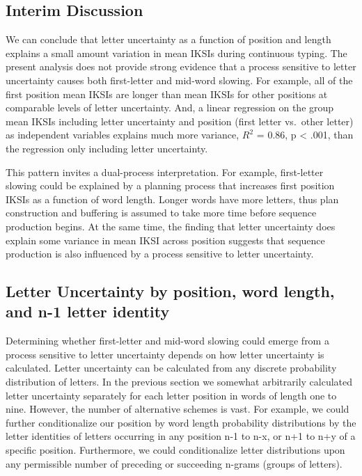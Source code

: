 \documentclass[,man,floatsintext]{apa6}
\begin{document}
\hypertarget{interim-discussion}{%
\subsection{Interim Discussion}\label{interim-discussion}}

We can conclude that letter uncertainty as a function of position and length explains a small amount variation in mean IKSIs during continuous typing. The present analysis does not provide strong evidence that a process sensitive to letter uncertainty causes both first-letter and mid-word slowing. For example, all of the first position mean IKSIs are longer than mean IKSIs for other positions at comparable levels of letter uncertainty. And, a linear regression on the group mean IKSIs including letter uncertainty and position (first letter vs.~other letter) as independent variables explains much more variance, \(R^2\) = 0.86, p \textless{} .001, than the regression only including letter uncertainty.

This pattern invites a dual-process interpretation. For example, first-letter slowing could be explained by a planning process that increases first position IKSIs as a function of word length. Longer words have more letters, thus plan construction and buffering is assumed to take more time before sequence production begins. At the same time, the finding that letter uncertainty does explain some variance in mean IKSI across position suggests that sequence production is also influenced by a process sensitive to letter uncertainty.

\hypertarget{letter-uncertainty-by-position-word-length-and-n-1-letter-identity}{%
\subsection{Letter Uncertainty by position, word length, and n-1 letter identity}\label{letter-uncertainty-by-position-word-length-and-n-1-letter-identity}}

Determining whether first-letter and mid-word slowing could emerge from a process sensitive to letter uncertainty depends on how letter uncertainty is calculated. Letter uncertainty can be calculated from any discrete probability distribution of letters. In the previous section we somewhat arbitrarily calculated letter uncertainty separately for each letter position in words of length one to nine. However, the number of alternative schemes is vast. For example, we could further conditionalize our position by word length probability distributions by the letter identities of letters occurring in any position n-1 to n-x, or n+1 to n+y of a specific position. Furthermore, we could conditionalize letter distributions upon any permissible number of preceding or succeeding n-grams (groups of letters).
\end{document}
